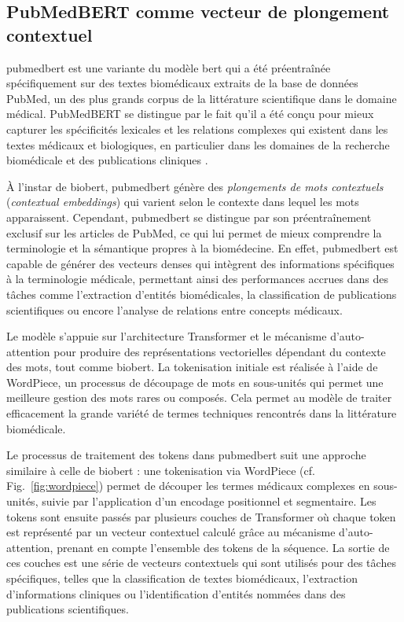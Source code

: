\documentclass[12pt]{report}
\begin{document}
\subsection{PubMedBERT comme vecteur de plongement contextuel}

\gls{pubmedbert} est une variante du modèle \gls{bert} qui a été préentraînée spécifiquement sur des textes biomédicaux extraits de la base de données PubMed, un des plus grands corpus de la littérature scientifique dans le domaine médical. PubMedBERT se distingue par le fait qu'il a été conçu pour mieux capturer les spécificités lexicales et les relations complexes qui existent dans les textes médicaux et biologiques, en particulier dans les domaines de la recherche biomédicale et des publications cliniques \cite{gu2020domain}. 

À l’instar de \gls{biobert}, \gls{pubmedbert} génère des \textit{plongements de mots contextuels} (\textit{contextual embeddings}) qui varient selon le contexte dans lequel les mots apparaissent. Cependant, \gls{pubmedbert} se distingue par son préentraînement exclusif sur les articles de PubMed, ce qui lui permet de mieux comprendre la terminologie et la sémantique propres à la biomédecine. En effet, \gls{pubmedbert} est capable de générer des vecteurs denses qui intègrent des informations spécifiques à la terminologie médicale, permettant ainsi des performances accrues dans des tâches comme l’extraction d’entités biomédicales, la classification de publications scientifiques ou encore l’analyse de relations entre concepts médicaux.

Le modèle s'appuie sur l’architecture Transformer et le mécanisme d’auto-attention pour produire des représentations vectorielles dépendant du contexte des mots, tout comme \gls{biobert}. La tokenisation initiale est réalisée à l’aide de WordPiece, un processus de découpage de mots en sous-unités qui permet une meilleure gestion des mots rares ou composés. Cela permet au modèle de traiter efficacement la grande variété de termes techniques rencontrés dans la littérature biomédicale.

Le processus de traitement des tokens dans \gls{pubmedbert} suit une approche similaire à celle de \gls{biobert} : une tokenisation via WordPiece (cf. Fig.~\ref{fig:wordpiece}) permet de découper les termes médicaux complexes en sous-unités, suivie par l'application d'un encodage positionnel et segmentaire. Les tokens sont ensuite passés par plusieurs couches de Transformer où chaque token est représenté par un vecteur contextuel calculé grâce au mécanisme d’auto-attention, prenant en compte l'ensemble des tokens de la séquence. La sortie de ces couches est une série de vecteurs contextuels qui sont utilisés pour des tâches spécifiques, telles que la classification de textes biomédicaux, l'extraction d'informations cliniques ou l'identification d'entités nommées dans des publications scientifiques.
\end{document}
